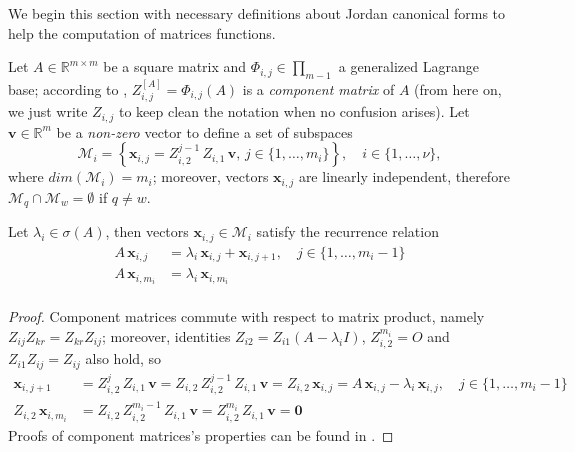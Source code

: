 
We begin this section with necessary definitions about Jordan canonical forms
to help the computation of matrices functions.

Let $A\in\mathbb{R}^{m\times m}$ be a square matrix and $\Phi_{i,j}
\in\prod_{m-1}$ a generalized Lagrange base; according to \cite{LT2002},
$Z_{i,j}^{[A]} = \Phi_{i,j}(A)$ is a \textit{component matrix} of $A$ (from
here on, we just write $Z_{i,j}$ to keep clean the notation when no confusion
arises). Let $\boldsymbol{v}\in\mathbb{R}^{m}$ be a \textit{non-zero} vector to
define a set of subspaces
\begin{displaymath}
\mathcal{M}_{i} = \left\lbrace \boldsymbol{x}_{i,j} = Z_{i,2}^{j-1}\,Z_{i,1}\,\boldsymbol{v},\,j\in\lbrace1,\ldots,m_{i}\rbrace\right\rbrace, \quad i\in \lbrace 1,\ldots,\nu \rbrace,
\end{displaymath}
where $dim(\mathcal{M}_{i})=m_{i}$; moreover, vectors $\boldsymbol{x}_{i,j}$ are
linearly independent, therefore $\mathcal{M}_{q}\cap\mathcal{M}_{w}=\emptyset$ if $q\neq w$.
\begin{lemma}
Let $\lambda_{i}\in\sigma(A)$, then vectors
$\boldsymbol{x}_{i,j}\in\mathcal{M}_{i}$ satisfy the recurrence relation
\begin{displaymath}
\begin{split}
A\,\boldsymbol{x}_{i,j} &= \lambda_{i}\,\boldsymbol{x}_{i,j} + \boldsymbol{x}_{i,j+1} , \quad j\in \lbrace 1,\ldots,m_{i}-1 \rbrace  \\
A\,\boldsymbol{x}_{i,m_{i}} &= \lambda_{i}\,\boldsymbol{x}_{i,m_{i}} \\
\end{split}
\end{displaymath}
\end{lemma}
\begin{proof}
Component matrices commute with respect to matrix product, namely
$Z_{ij}Z_{kr}= Z_{kr}Z_{ij}$; moreover, identities $Z_{i2} = Z_{i1}(A-\lambda_{i}I)$,
$Z_{i,2}^{m_{i}}=O$ and $Z_{i1}Z_{ij}=Z_{ij}$ also hold, so
\begin{displaymath}
\begin{split}
\boldsymbol{x}_{i,j+1} &= Z_{i,2}^{j}\,Z_{i,1}\,\boldsymbol{v} = Z_{i,2}\,Z_{i,2}^{j-1}\,Z_{i,1}\,\boldsymbol{v} =  Z_{i,2}\,\boldsymbol{x}_{i,j}=A\,\boldsymbol{x}_{i,j} - \lambda_{i}\,\boldsymbol{x}_{i,j}, \quad j\in \lbrace 1,\ldots,m_{i}-1 \rbrace  \\
Z_{i,2}\,\boldsymbol{x}_{i,m_{i}} &=  Z_{i,2}\,Z_{i,2}^{m_{i}-1}\,Z_{i,1}\,\boldsymbol{v} = Z_{i,2}^{m_{i}}\,Z_{i,1}\,\boldsymbol{v} = \boldsymbol{0}
\end{split}
\end{displaymath}
Proofs of component matrices's properties can be found in \cite{BT1998, LT2002}.
\end{proof}
